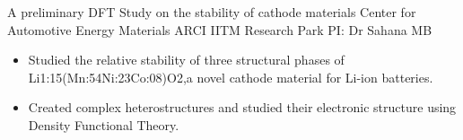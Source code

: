 

        {A preliminary DFT Study on the stability of cathode materials}
        {\newline Center for Automotive Energy Materials}
        {ARCI IITM Research Park}
        {PI: Dr Sahana MB}{
    \begin{itemize}
		\item Studied the relative stability of three structural phases of Li1:15(Mn:54Ni:23Co:08)O2,a novel cathode material for Li-ion batteries.
		\item Created complex heterostructures and studied
		their electronic structure using Density Functional Theory.
    \end{itemize}
	}

